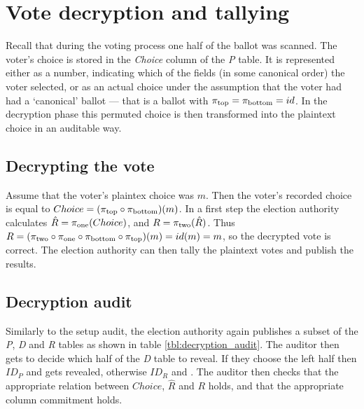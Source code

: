 \chapter{Vote decryption and tallying}

Recall that during the voting process one half of the ballot was scanned. The
voter's choice is stored in the \emph{Choice} column of the \emph{P} table. It
is represented either as a number, indicating which of the fields (in some
canonical order) the voter selected, or as an actual choice under the
assumption that the voter had had a `canonical' ballot --- that is a ballot
with $\pi_{\text{top}} = \pi_{\text{bottom}} = id$. In the decryption phase this permuted choice is
then transformed into the plaintext choice in an auditable way.

\section{Decrypting the vote}

Assume that the voter's plaintex choice was $m$. Then the voter's recorded
choice is equal to $Choice = (\pi_{\text{top}}{} \circ \pi_{\text{bottom}}{})(m)$. In a first step
the election authority calculates $\hat{R} = \pi_{\text{one}}{}(Choice)$, and $R =
\pi_{\text{two}}{}(\hat{R})$. Thus $R = (\pi_{\text{two}} \circ \pi_{\text{one}} \circ \pi_{\text{bottom}} \circ \pi_{\text{top}})(m)
= id(m) = m$, so the decrypted vote is correct. The election authority can then
tally the plaintext votes and publish the results.

\section{Decryption audit}

Similarly to the setup audit, the election authority again publishes a subset
of the \emph{P}, \emph{D} and \emph{R} tables as shown in table
\ref{tbl:decryption_audit}. The auditor then gets to decide which half of the
\emph{D} table to reveal. If they choose the left half then $ID_P$ and \pone{}
gets revealed, otherwise $ID_R$ and \ptwo{}. The auditor then checks that the
appropriate relation between $Choice$, $\hat{R}$ and $R$ holds, and that the
appropriate column commitment holds.

